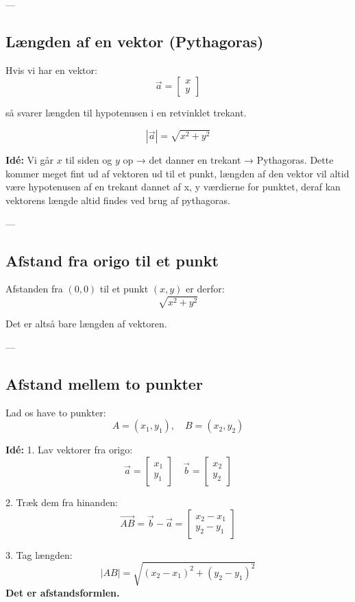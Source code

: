 ---

\subsection{Længden af en vektor (Pythagoras)}
Hvis vi har en vektor:
\[
\vec{a} =
\begin{bmatrix}
x \\
y
\end{bmatrix}
\]

så svarer længden til hypotenusen i en retvinklet trekant.

\[
|\vec{a}| = \sqrt{x^2 + y^2}
\]

\textbf{Idé:}  
Vi går $x$ til siden og $y$ op → det danner en trekant → Pythagoras.
Dette kommer meget fint ud af vektoren ud til et punkt, længden af den vektor vil altid være hypotenusen af en trekant dannet af x, y værdierne for punktet, deraf kan vektorens længde altid findes ved brug af pythagoras.


---

\subsection{Afstand fra origo til et punkt}
Afstanden fra $(0,0)$ til et punkt $(x,y)$ er derfor:
\[
\sqrt{x^2 + y^2}
\]

Det er altså bare længden af vektoren.

---

\subsection{Afstand mellem to punkter}
Lad os have to punkter:
\[
A = (x_1, y_1), \quad B = (x_2, y_2)
\]

\textbf{Idé:}
1. Lav vektorer fra origo:
\[
\vec{a} =
\begin{bmatrix}
x_1 \\
y_1
\end{bmatrix}
\quad
\vec{b} =
\begin{bmatrix}
x_2 \\
y_2
\end{bmatrix}
\]

2. Træk dem fra hinanden:
\[
\vec{AB} = \vec{b} - \vec{a} =
\begin{bmatrix}
x_2 - x_1 \\
y_2 - y_1
\end{bmatrix}
\]

3. Tag længden:
\[
|AB| = \sqrt{(x_2 - x_1)^2 + (y_2 - y_1)^2}
\]
\textbf{Det er afstandsformlen.}

